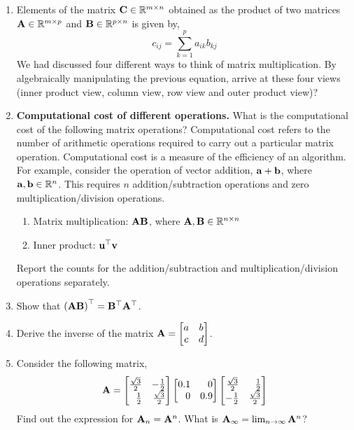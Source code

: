\begin{enumerate}
    \item Elements of the matrix $\mathbf{C} \in \mathbb{R}^{m \times n}$ obtained as the product of two matrices $\mathbf{A} \in \mathbb{R}^{m \times p}$ and $\mathbf{B} \in \mathbb{R}^{p \times n}$ is given by,
    \[ c_{ij} = \sum_{k=1}^{p}a_{ik}b_{kj} \]
    We had discussed four different ways to think of matrix multiplication. By algebraically manipulating the previous equation, arrive at these four views (inner product view, column view, row view and outer product view)?
    
    \item \textbf{Computational cost of different operations.} What is the computational cost of the following matrix operations? Computational cost refers to the number of arithmetic operations  required to carry out a particular matrix operation. Computational cost is a measure of the efficiency of an algorithm. For example, consider the operation of vector addition, $\mathbf{a} + \mathbf{b}$, where $\mathbf{a}, \mathbf{b} \in \mathbb{R}^n$. This requires $n$ addition/subtraction operations and zero multiplication/division operations.
    \begin{enumerate}
        \item Matrix multiplication: $\mathbf{AB}$, where $\mathbf{A}, \mathbf{B} \in \mathbb{R}^{n \times n}$
        \item Inner product: $\mathbf{u}^\top\mathbf{v}$
    \end{enumerate} 
    Report the counts for the addition/subtraction and multiplication/division operations separately.
    
    \item Show that $\left( \mathbf{A}\mathbf{B}\right)^\top = \mathbf{B}^\top\mathbf{A}^\top$.
    
    \item Derive the inverse of the matrix $\mathbf{A} = \begin{bmatrix}a & b\\c & d\end{bmatrix}$.
    
    \item Consider the following matrix,
    \[ \mf{A} = \bmx \frac{\sqrt{3}}{2} & -\frac{1}{2}\\\frac{1}{2} & \frac{\sqrt{3}}{2} \emx \bmx 0.1 & 0\\0 & 0.9 \emx \bmx \frac{\sqrt{3}}{2} & \frac{1}{2}\\-\frac{1}{2} & \frac{\sqrt{3}}{2} \emx \]
    Find out the expression for $\mathbf{A}_n = \mathbf{A}^n$. What is $\mathbf{A}_\infty = \lim_{n\to\infty} \mathbf{A}^n$?


\end{enumerate}
